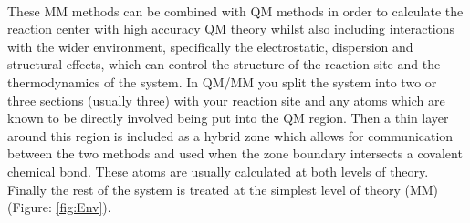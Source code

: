 \paragraph{}
These MM methods can be combined with QM methods in order to calculate the reaction center with high accuracy QM theory whilst also including interactions with the wider environment, specifically the electrostatic, dispersion and structural effects, which can control the structure of the reaction site and the thermodynamics of the system. In QM/MM you split the system into two or three sections (usually three) with your reaction site and any atoms which are known to be directly involved being put into the QM region. Then a thin layer around this region is included  as a hybrid zone which allows for communication between the two methods and used when the zone boundary intersects a covalent chemical bond. These atoms are usually calculated at both levels of theory. Finally the rest of the system is treated at the simplest level of theory (MM) (Figure: \ref{fig:Env}).
